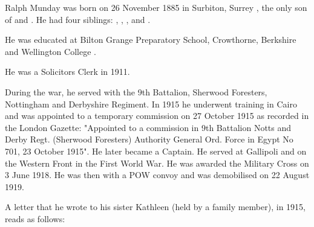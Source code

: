 
Ralph Munday was born on 26 November 1885 in Surbiton, Surrey \cite{RMundayBirth}, the only son of  and .
He had four siblings: , , , and .

He was educated at Bilton Grange Preparatory School, Crowthorne, Berkshire and Wellington College \cite{RMundayEducation}.

He was a Solicitors Clerk in 1911\cite{RMundayOccupation}. 

During the war, he served with the 9th Battalion, Sherwood Foresters, Nottingham and Derbyshire Regiment. In 1915 he underwent training in Cairo and was appointed to a temporary commission on 27 October 1915 \cite{RMundayWar} as recorded in the London Gazette:  "Appointed to a commission in 9th Battalion Notts and Derby Regt. (Sherwood Foresters) Authority General Ord. Force in Egypt No 701, 23 October 1915".  He later became a Captain. He  served at Gallipoli and on the Western Front in the First World War. He was awarded the Military Cross on 3 June 1918. He was then with a POW convoy and was demobilised on 22 August 1919.

A letter that he wrote to his sister Kathleen (held by a family member), in 1915, reads as follows:

